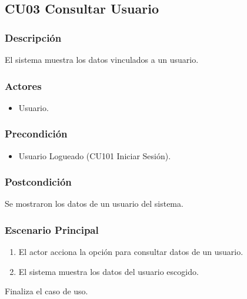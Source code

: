 \subsection{CU03 Consultar Usuario}
\subsubsection{Descripci\'{o}n}
El sistema muestra los datos vinculados a un usuario.
\subsubsection{Actores}
\begin{itemize}
\item Usuario.
\end{itemize}
\subsubsection{Precondici\'{o}n}
\begin{itemize}
\item Usuario Logueado (CU101 Iniciar Sesi\'{o}n).
\end{itemize}
\subsubsection{Postcondici\'{o}n}
Se mostraron los datos de un usuario del sistema.
\subsubsection{Escenario Principal}
\begin{enumerate}
\item El actor acciona la opci\'{o}n para consultar datos de un usuario.
\item El sistema muestra los datos del usuario escogido.
\end{enumerate}
Finaliza el caso de uso.